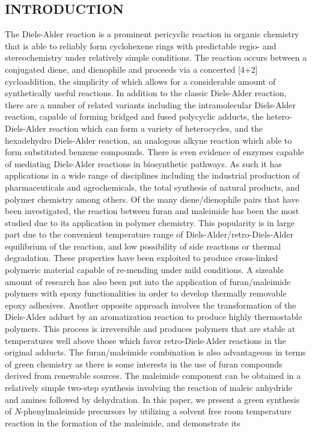 \documentclass[11pt]{article}
\begin{document}
\linespread{1.25}
\raggedright
\setlength{\parskip}{2pt}
\setlength{\belowcaptionskip}{-8pt}
\def\citenumfont{\textnormal}
\renewcommand{\bibsection}{}

\subsection*{INTRODUCTION}
The Diels-Alder reaction is a prominent pericyclic reaction in organic chemistry that is able to reliably form cyclohexene rings with predictable regio- and stereochemistry under relatively simple conditions.\cite{Brocksom2001} The reaction occurs between a conjugated diene, and dienophile and proceeds via a concerted [4+2] cycloaddition, the simplicity of which allows for a considerable amount of synthetically useful reactions.\cite{Nicolaou2002} In addition to the classic Diels-Alder reaction, there are a number of related variants including the intramolecular Diels-Alder reaction, capable of forming bridged and fused polycyclic adducts, the hetero-Diels-Alder reaction which can form a variety of heterocycles, and the hexadehydro Diels-Alder reaction, an analogous alkyne reaction which able to form substituted benzene compounds.\cite{Heravi2015,Hoye2012} There is even evidence of enzymes capable of mediating Diels-Alder reactions in biosynthetic pathways.\cite{Stocking2003} As such it has applications in a wide range of disciplines including the industrial production of pharmaceuticals and agrochemicals, the total synthesis of natural products, and polymer chemistry among others.\cite{Funel2013,Nicolaou2002,Briou2021}  Of the many diene/dienophile pairs that have been investigated, the reaction between furan and maleimide has been the most studied due to its application in polymer chemistry.\cite{Briou2021} This popularity is in large part due to the convenient temperature range of Diels-Alder/retro-Diels-Alder equilibrium of the reaction, and low possibility of side reactions or thermal degradation.\cite{Gandini2013} These properties have been exploited to produce cross-linked polymeric material capable of re-mending under mild conditions.\cite{Chen2002} A sizeable amount of research has also been put into the application of furan/maleimide polymers with epoxy functionalities in order to develop thermally removable epoxy adhesives.\cite{Mcelhanon2002} Another opposite approach involves the transformation of the Diels-Alder adduct by an aromatization reaction to produce highly thermostable polymers.\cite{Gandini2013} This process is irreversible and produces polymers that are stable at temperatures well above those which favor retro-Diels-Alder reactions in the original adducts.\cite{Tesoro1986} The furan/maleimide combination is also advantageous in terms of green chemistry as there is some interests in the use of furan compounds derived from renewable sources.\cite{Gandini2008} The maleimide component can be obtained in a relatively simple two-step synthesis involving the reaction of maleic anhydride and amines followed by dehydration.\cite{Briou2021} In this paper, we present a green synthesis of \textit{N}-phenylmaleimide precursors by utilizing a solvent free room temperature reaction in the formation of the maleimide, and demonstrate its 
\end{document}
